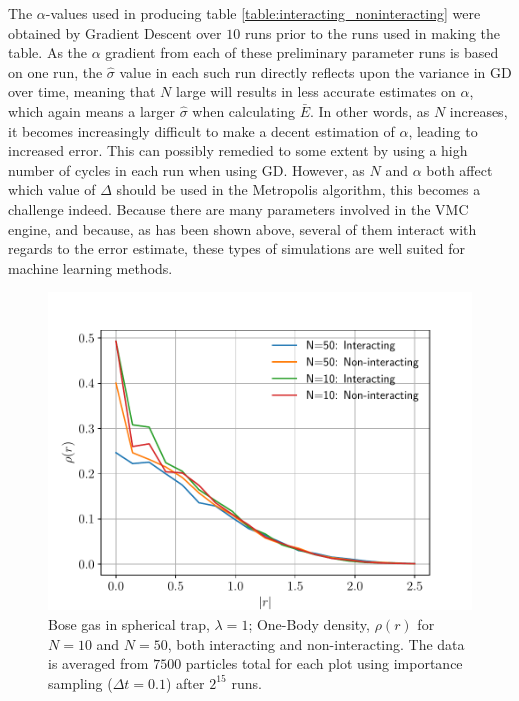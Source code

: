 \documentclass[%
oneside,                 %
final,                   %
10pt]{article}
\begin{document}
The $\alpha$-values used in producing table \ref{table:interacting_noninteracting} were obtained by Gradient Descent over $10$ runs prior to the runs used in making the table. As the $\alpha$ gradient from each of these preliminary parameter runs is based on one run, the $\hat \sigma$ value in each such run directly reflects upon the variance in GD over time, meaning that $N$ large will results in less accurate estimates on $\alpha$, which again means a larger $\hat \sigma$ when calculating $\bar E$. In other words, as $N$ increases, it becomes increasingly difficult to make a decent estimation of $\alpha$, leading to increased error. This can possibly remedied to some extent by using a high number of cycles in each run when using GD. However, as $N$ and $\alpha$ both affect which value of $\Delta$ should be used in the Metropolis algorithm, this becomes a challenge indeed. Because there are many parameters involved in the VMC engine, and because, as has been shown above, several of them interact with regards to the error estimate, these types of simulations are well suited for machine learning methods. 

\begin{figure}[!h]
        \centering 
         \includegraphics[scale=0.6]{../Results/Densitites/densitites_plot.pdf} 
        \caption{Bose gas in spherical trap, $\lambda=1$; One-Body density, $\rho(r)$ for $N=10$ and $N=50$, both interacting and non-interacting. The data is averaged from $7500$ particles total for each plot using importance sampling ($\Delta t=0.1$) after $2^{15}$ runs.}
        \label{fig:densities}   
\end{figure}  
\end{document}
